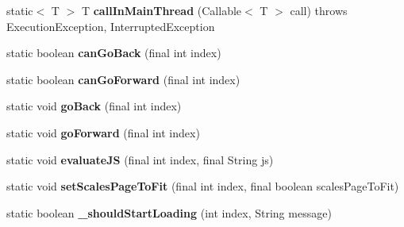 \begin{DoxyCompactItemize}
static$<$ T $>$ T {\bfseries call\+In\+Main\+Thread} (Callable$<$ T $>$ call)  throws Execution\+Exception, Interrupted\+Exception 
\item 
\mbox{\label{classorg_1_1cocos2dx_1_1lib_1_1Cocos2dxWebViewHelper_a1df26a1edb7a428cd82bd72cfe772c9b}} 
static boolean {\bfseries can\+Go\+Back} (final int index)
\item 
\mbox{\label{classorg_1_1cocos2dx_1_1lib_1_1Cocos2dxWebViewHelper_ad90244d00b4d47df9356871d922e9176}} 
static boolean {\bfseries can\+Go\+Forward} (final int index)
\item 
\mbox{\label{classorg_1_1cocos2dx_1_1lib_1_1Cocos2dxWebViewHelper_ae521dec4b9cff13c771bc1818a656c33}} 
static void {\bfseries go\+Back} (final int index)
\item 
\mbox{\label{classorg_1_1cocos2dx_1_1lib_1_1Cocos2dxWebViewHelper_a7b6a8dae8dd16835905725d6b22b4550}} 
static void {\bfseries go\+Forward} (final int index)
\item 
\mbox{\label{classorg_1_1cocos2dx_1_1lib_1_1Cocos2dxWebViewHelper_ac5048999609f5cbafa5dde381f8a9b2b}} 
static void {\bfseries evaluate\+JS} (final int index, final String js)
\item 
\mbox{\label{classorg_1_1cocos2dx_1_1lib_1_1Cocos2dxWebViewHelper_af73a160f8b87692ce90951283e844020}} 
static void {\bfseries set\+Scales\+Page\+To\+Fit} (final int index, final boolean scales\+Page\+To\+Fit)
\item 
\mbox{\label{classorg_1_1cocos2dx_1_1lib_1_1Cocos2dxWebViewHelper_abed07ad04494066532792a3fc0dcbc88}} 
static boolean {\bfseries \+\_\+should\+Start\+Loading} (int index, String message)
\item 
\mbox{\label{classorg_1_1cocos2dx_1_1lib_1_1Cocos2dxWebViewHelper_a38989e197e5411f29d9fa7592532c033}} 

\end{DoxyCompactItemize}
